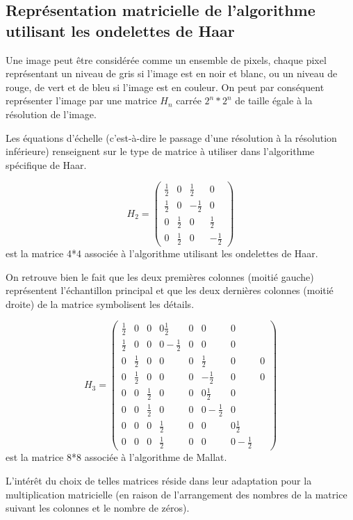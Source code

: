 \documentclass{article}
\begin{document}
\subsection{Représentation matricielle de l’algorithme utilisant les ondelettes de Haar}

Une image peut être considérée comme un ensemble de pixels, chaque pixel représentant un niveau de gris si l’image est en noir et blanc, ou un niveau de rouge, de vert et de bleu si l’image est en couleur. On peut par conséquent représenter l’image par une matrice $H_n$  carrée $2^n*2^n$ de taille égale à la résolution de l’image.

Les équations d’échelle (c’est-à-dire le passage d’une résolution à la résolution inférieure) renseignent sur le type de matrice à utiliser dans l’algorithme spécifique de Haar.


\[H_2 = \begin{pmatrix}
\frac{1}{2} & 0 & \frac{1}{2} & 0 \\
\frac{1}{2} & 0 & -\frac{1}{2} & 0 \\
0 & \frac{1}{2} & 0 & \frac{1}{2} \\
0 & \frac{1}{2} & 0 & -\frac{1}{2}
\end{pmatrix}
\] est la matrice 4*4 associée à l’algorithme utilisant les ondelettes de Haar.

On retrouve bien le fait que les deux premières colonnes (moitié gauche) représentent l’échantillon principal et que les deux dernières colonnes (moitié droite) de la matrice symbolisent les détails.

\[H_3 = \begin{pmatrix}
\frac{1}{2} & 0 & 0 & 0 \frac{1}{2} & 0 & 0 & 0 \\
\frac{1}{2} & 0 & 0 & 0 -\frac{1}{2} & 0 & 0 & 0\\
0 & \frac{1}{2} & 0 & 0 & 0 & \frac{1}{2} &0 & 0 \\
0 & \frac{1}{2} & 0 & 0 & 0 & -\frac{1}{2} & 0 & 0 \\
0 & 0 & \frac{1}{2} & 0 & 0 & 0 \frac{1}{2} & 0 \\ 
0 & 0 & \frac{1}{2} & 0 & 0 & 0 -\frac{1}{2} & 0 \\ 
0 & 0 & 0 & \frac{1}{2} & 0 & 0 & 0 \frac{1}{2} \\ 
0 & 0 & 0 & \frac{1}{2} & 0 & 0 & 0 -\frac{1}{2} 
\end{pmatrix}
\] est la matrice 8*8 associée à l'algorithme de Mallat.


L’intérêt du choix de telles matrices réside dans leur adaptation pour la multiplication matricielle (en raison de l’arrangement des nombres de la matrice suivant les colonnes et le nombre de zéros).
\end{document}
